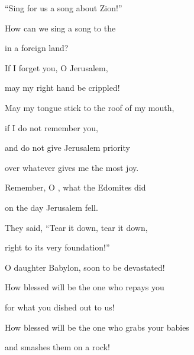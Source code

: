 {\par }{\Q “Sing
for us a song
about Zion!”
\par }{\Q {}How
can we sing
a song
to the
{}
\par }{\Q in a foreign
land?
\par }{\Q {}If
I forget
you, O Jerusalem,
\par }{\Q may my right hand
be crippled!
\par }{\Q {}May my tongue
stick
to the roof of my mouth,
\par }{\Q if
I do not
remember
you,
\par }{\Q and do not
give Jerusalem
priority
\par }{\Q over
whatever gives me the most joy.
\par }{\Q {}Remember,
O
{}, what the Edomites
did
\par }{\Q on the day
Jerusalem
fell.
\par }{\Q They said,
“Tear
it down, tear
it down,

\par }{\Q right to its very
foundation!”
\par }{\Q {}O daughter
Babylon,
soon to be devastated!

\par }{\Q How blessed
will be the one who repays
you
\par }{\Q for what you dished
out to us!
\par }{\Q {}How blessed
will be the one who grabs
your babies
\par }{\Q and smashes
them on
a rock!


}
